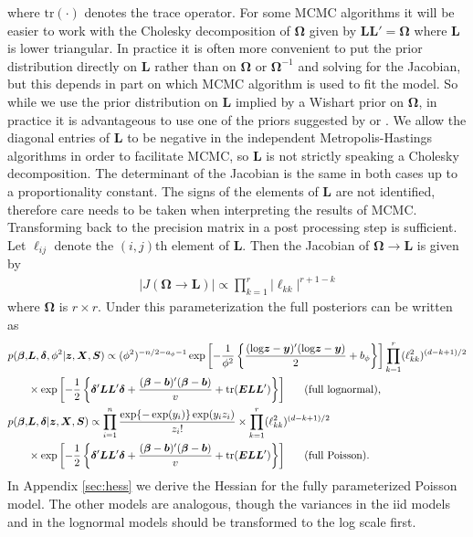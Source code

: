 \documentclass[12pt]{article}
\def\log{\hbox{log}}
\begin{document}
where $\mathrm{tr}(\cdot)$ denotes the trace operator. For some MCMC algorithms it will be easier to work with the Cholesky decomposition of $\bm{\Omega}$ given by $\bm{L}\bm{L}'=\bm{\Omega}$ where $\bm{L}$ is lower triangular. In practice it is often more convenient to put the prior distribution directly on $\bm{L}$ rather than on $\bm{\Omega}$ or $\bm{\Omega}^{-1}$ and solving for the Jacobian, but this depends in part on which MCMC algorithm is used to fit the model. So while we use the prior distribution on $\bm{L}$ implied by a Wishart prior on $\bm{\Omega}$, in practice it is advantageous to use one of the priors suggested by \citet{chen2003random} or \citet{fruhwirth2008bayesian}. We allow the diagonal entries of $\bm{L}$ to be negative in the independent Metropolis-Hastings algorithms in order to facilitate MCMC, so $\bm{L}$ is not strictly speaking a Cholesky decomposition. The determinant of the Jacobian is the same in both cases up to a proportionality constant. The signs of the elements of $\bm{L}$ are not identified, therefore care needs to be taken when interpreting the results of MCMC. Transforming back to the precision matrix in a post processing step is sufficient. Let $\ell_{ij}$ denote the $(i,j)$th element of $\bm{L}$. Then the Jacobian of $\bm{\Omega}\to\bm{L}$ is given by
\begin{align*}
|J(\bm{\Omega}\to\bm{L})| \propto \prod_{k=1}^r |\ell_{kk}|^{r + 1 - k}
\end{align*}
where $\bm{\Omega}$ is $r\times r$. Under this parameterization the full posteriors can be written as
\begin{align}
p(\bm{\beta},& \bm{L}, \bm{\delta}, \phi^2|\bm{z}, \bm{X}, \bm{S}) \propto (\phi^2)^{-n/2 - a_\phi - 1}\exp\left[-\frac{1}{\phi^2}\left\{\frac{(\log\bm{z} - \bm{y})'(\log\bm{z} - \bm{y})}{2} + b_\phi\right\}\right] \prod_{k=1}^r (\ell_{kk}^2)^{(d - k + 1)/2}\nonumber\\
&\times \exp\left[-\frac{1}{2}\left\{\bm{\delta}'\bm{L}\bm{L}'\bm{\delta}+\frac{(\bm{\beta} - \bm{b})'(\bm{\beta} - \bm{b})}{v} + \mathrm{tr}(\bm{E}\bm{L}\bm{L}')\right\}\right]\mbox{\ \ \ \ \ (full lognormal),}\label{eq:fullnormpostchol}\\
p(\bm{\beta},& \bm{L}, \bm{\delta}|\bm{z}, \bm{X}, \bm{S}) \propto \prod_{i=1}^n \frac{\exp\{-\exp(y_i)\}\exp(y_iz_i)}{z_i!} \times \prod_{k=1}^r (\ell_{kk}^2)^{(d - k + 1)/2}  \nonumber\\
&\times \exp\left[-\frac{1}{2}\left\{\bm{\delta}'\bm{L}\bm{L}'\bm{\delta}+\frac{(\bm{\beta} - \bm{b})'(\bm{\beta} - \bm{b})}{v} + \mathrm{tr}(\bm{E}\bm{L}\bm{L}')\right\}\right]\mbox{\ \ \ \ \ (full Poisson).}\label{eq:fullpoispostchol}
\end{align}
In Appendix \ref{sec:hess} we derive the Hessian for the fully parameterized Poisson model. The other models are analogous, though the variances in the iid models and in the lognormal models should be transformed to the log scale first.
\end{document}
